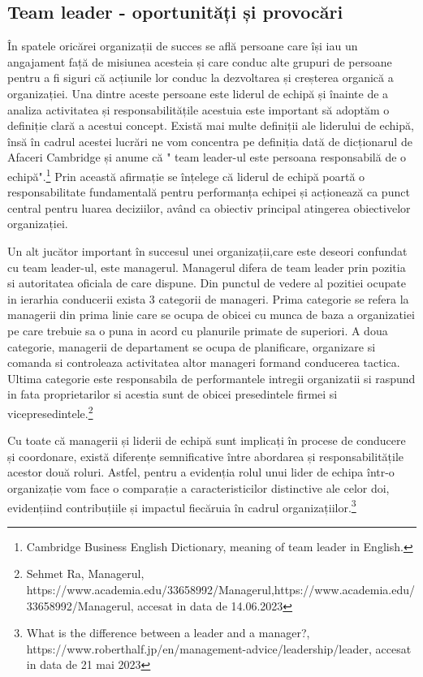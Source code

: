 \documentclass[a4paper, 12pt]{article}
\begin{document}
		\subsection{ Team leader - oportunități și provocări}

\quad\quad\space În spatele oricărei organizații de succes se află persoane care își iau un angajament față de misiunea acesteia și care conduc alte grupuri de persoane pentru a fi siguri că acțiunile lor conduc la dezvoltarea și creșterea organică a organizației. Una dintre aceste persoane este liderul de echipă și înainte de a analiza activitatea și responsabilitățile acestuia este important să adoptăm o definiție clară a acestui concept. Există mai multe definiții ale liderului de echipă, însă în cadrul acestei lucrări ne vom concentra pe definiția dată de dicționarul de Afaceri Cambridge și anume că " team leader-ul  este persoana responsabilă de o echipă".\footnote{Cambridge Business English Dictionary, meaning of team leader in English.} Prin această afirmație se înțelege că liderul de echipă poartă o responsabilitate fundamentală pentru performanța echipei și acționează ca punct central pentru luarea deciziilor, având ca obiectiv principal atingerea obiectivelor organizației.

	\quad\quad Un alt jucător important în succesul unei organizații,care este deseori confundat cu team leader-ul, este managerul. Managerul difera de team leader prin pozitia si autoritatea oficiala de care dispune. Din punctul de vedere al pozitiei ocupate in ierarhia conducerii exista 3 categorii de manageri. Prima categorie se refera la managerii din prima linie care se ocupa de obicei cu munca de baza a organizatiei pe care trebuie sa o puna in acord cu planurile primate de superiori. A doua categorie, managerii de departament se ocupa de planificare, organizare si comanda si controleaza activitatea altor manageri formand conducerea tactica. Ultima categorie este responsabila de performantele intregii organizatii si raspund in fata proprietarilor si acestia sunt de obicei presedintele firmei si vicepresedintele.\footnote{Sehmet Ra, Managerul, https://www.academia.edu/33658992/Managerul,https://www.academia.edu/33658992/Managerul,  accesat in data de 14.06.2023}


	\quad Cu toate că managerii și liderii de echipă sunt implicați în procese de conducere și coordonare, există diferențe semnificative între abordarea și responsabilitățile acestor două roluri. Astfel, pentru a evidenția rolul unui lider de echipa într-o organizație vom face o comparație a caracteristicilor distinctive ale celor doi, evidențiind contribuțiile și impactul fiecăruia în cadrul organizațiilor.\footnote{What is the difference between a leader and a manager?, https://www.roberthalf.jp/en/management-advice/leadership/leader, accesat in data de 21 mai 2023}
\newpage
\end{document}
